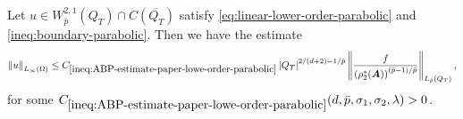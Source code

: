 \documentclass[final,onefignum,onetabnum]{mousaviart}
\begin{document}
	\begin{lemma}
		\label{corollary:ABP-estimate-paper-lower-order-parabolic}
		Let $u \in W^{2,1}_{\bar{p}}(Q_T) \cap C(\overline{Q_T})$ satisfy \eqref{eq:linear-lower-order-parabolic} and \eqref{ineq:boundary-parabolic}. Then
		we have the estimate 
		\begin{equation}
			\label{ineq:ABP-estimate-paper-lowe-order-parabolic}
			\left\|  u \right\|_{L_{\infty}(\Omega)}  
			\leq
			C_{\ref{ineq:ABP-estimate-paper-lowe-order-parabolic}}
			\left| Q_T \right|^{2/(d+2) - 1/{\bar{p}}} 
			\left\| \dfrac{f}{\left( \rho_2^{\ast}(\boldsymbol{A}) \right)^{(\bar{p} - 1)/ \bar{p}} } \right\|_{L_{\bar{p}}(Q_T)} , 
		\end{equation}
		for some $C_{\ref{ineq:ABP-estimate-paper-lowe-order-parabolic}}(d, \bar{p}, \sigma_1, \sigma_2, \lambda) >0$.
	\end{lemma}
\end{document}
